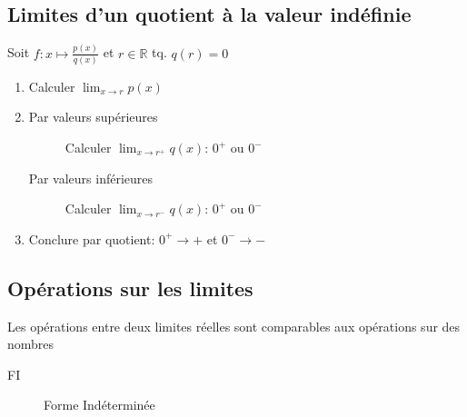\documentclass{article}
\newcommand{\R}{\mathds{R}}
\begin{document}
\subsection{Limites d'un quotient à la valeur indéfinie}

Soit $f:x\mapsto\frac{p(x)}{q(x)}$ et $r \in \R$ tq. $q(r) = 0$

\begin{enumerate}
    \item Calculer $\displaystyle \lim_{x\to r} p(x)$
    \item
        \begin{description}
        
            \item[Par valeurs supérieures] Calculer $\displaystyle\lim_{x\to r^+} q(x)$: $0^+$ ou $0^-$
            \item[Par valeurs inférieures] Calculer $\displaystyle\lim_{x\to r^-} q(x)$: $0^+$ ou $0^-$
        \end{description}
    \item Conclure par quotient: $0^+ \to +$ et $0^- \to -$
\end{enumerate}



\subsection{Opérations sur les limites}\label{ops_limites}

Les opérations entre deux limites réelles sont comparables aux opérations sur des nombres
\begin{description}
\item[FI] Forme Indéterminée
\end{description}
\end{document}
